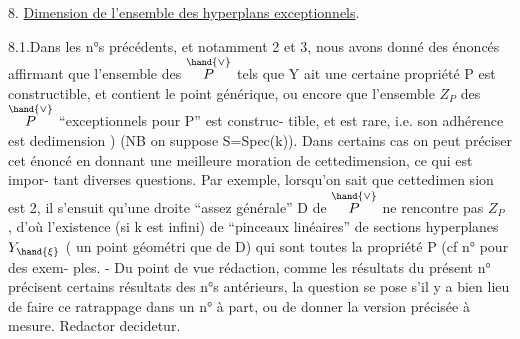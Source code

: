 
8. \uline{Dimension de l'ensemble des hyperplans exceptionnels}.

8.1.Dans les n°s précédents, et notamment 2 et 3, nous avons donné des
énoncés affirmant que l'ensemble des \hand{$\xi\in$} $\overset{\hand{\vee}}{P}$ tels que Y ait une certaine
propriété P est constructible, et contient le point générique,  ou
encore que l'ensemble $Z_P$ des \hand{$\xi\in$} $\overset{\hand{\vee}}{P}$ ``exceptionnels pour P'' est construc-%
tible, et est rare, i.e. son adhérence est dedimension \hand{$\geq$} ) 
(NB on suppose S=Spec(k)). Dans certains cas on peut préciser cet énoncé
en donnant une meilleure moration de cettedimension, ce qui est impor-%
tant  diverses questions. Par exemple, lorsqu'on sait que cettedimen
sion est \hand{$\geq$} 2, il s'ensuit qu'une droite ``assez générale'' D de $\overset{\hand{\vee}}{P}$
ne rencontre pas $Z_P$ , d'où l'existence (si k est infini) de ``pinceaux
linéaires'' de sections hyperplanes  $Y_{\hand{\xi}}$ (\hand{$\xi$} un point géométri
que de D) qui sont toutes la propriété P (cf n°  pour des exem-%
ples. - Du point de vue rédaction, comme les résultats du présent n°
précisent certains résultats des n°s antérieurs, la question se pose s'il
y a bien lieu de faire ce ratrappage dans un n° à part, ou de donner la
version précisée à mesure. Redactor decidetur.

